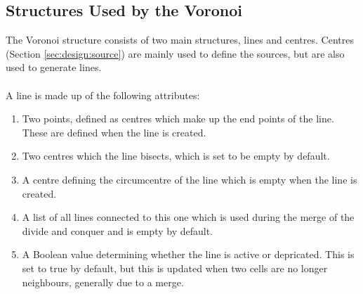 \subsection{Structures Used by the Voronoi}
The Voronoi structure consists of two main structures, lines and centres. Centres (Section \ref{sec:design:source}) are mainly used to define the sources, but are also used to generate lines.
\\
\\
A line is made up of the following attributes:
\begin{enumerate}
\item Two points, defined as centres which make up the end points of the line. These are defined when the line is created.
\item Two centres which the line bisects, which is set to be empty by default.
\item A centre defining the circumcentre of the line which is empty when the line is created.
\item A list of all lines connected to this one which is used during the merge of the divide and conquer and is empty by default.
\item A Boolean value determining whether the line is active or depricated. This is set to true by default, but this is updated when two cells are no longer neighbours, generally due to a merge.
\end{enumerate}


